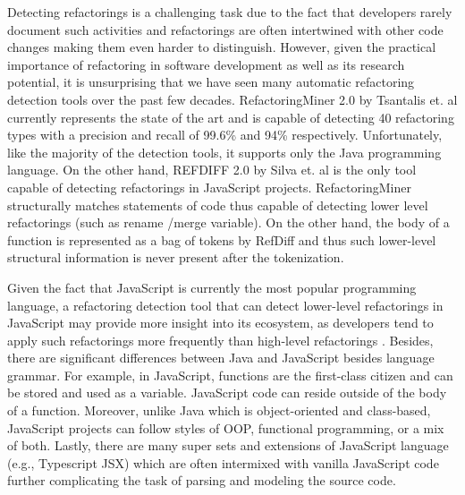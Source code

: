 \documentclass[letterpaper,12pt,onecolumn,final]{report}
\begin{document}
Detecting refactorings is a challenging task due to the fact that developers rarely document such activities \cite{alomar2021refactoring} and refactorings are often intertwined with other code changes making them even harder to distinguish. However, given the practical importance of refactoring in software development as well as its research potential, it is unsurprising that we have seen many automatic refactoring detection tools over the past few decades. RefactoringMiner 2.0 by Tsantalis et. al \cite{Tsantalis2020} currently represents the state of the art and is capable of detecting 40 refactoring types with a precision and recall of 99.6\% and 94\% respectively.  Unfortunately, like the majority of the detection tools, it supports only the Java programming language. On the other hand, REFDIFF 2.0 by Silva et. al  \cite{Silva2020} is the only tool capable of detecting refactorings in JavaScript projects. RefactoringMiner structurally matches statements of code thus capable of detecting lower level refactorings (such as rename /merge variable). On the other hand, the body of a function is represented as a bag of tokens by RefDiff and thus such lower-level structural information is never present after the tokenization.

Given the fact that JavaScript is currently the most popular programming language, a refactoring detection tool that can detect lower-level refactorings in JavaScript may provide more insight into its ecosystem, as developers tend to apply such refactorings more frequently than high-level refactorings \cite{MurphyHill2012}. Besides, there are significant differences between Java and JavaScript besides language grammar. For example, in JavaScript, functions are the first-class citizen and can be stored and used as a variable. JavaScript code can reside outside of the body of a function. Moreover, unlike Java which is object-oriented and class-based, JavaScript projects can follow styles of OOP, functional programming, or a mix of both. Lastly, there are many super sets and extensions of JavaScript language (e.g., Typescript JSX) which are often intermixed with vanilla JavaScript code further complicating the task of parsing and modeling the source code.
\end{document}
